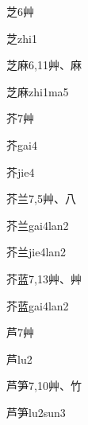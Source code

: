 \begin{Entry}{芝}{6}{⾋}
  \begin{Phonetics}{芝}{zhi1}
  \end{Phonetics}
\end{Entry}

\begin{Entry}{芝麻}{6,11}{⾋、⿇}
  \begin{Phonetics}{芝麻}{zhi1ma5}
  \end{Phonetics}
\end{Entry}

\begin{Entry}{芥}{7}{⾋}
  \begin{Phonetics}{芥}{gai4}
  \end{Phonetics}
  \begin{Phonetics}{芥}{jie4}
  \end{Phonetics}
\end{Entry}

\begin{Entry}{芥兰}{7,5}{⾋、⼋}
  \begin{Phonetics}{芥兰}{gai4lan2}
  \end{Phonetics}
  \begin{Phonetics}{芥兰}{jie4lan2}
  \end{Phonetics}
\end{Entry}

\begin{Entry}{芥蓝}{7,13}{⾋、⾋}
  \begin{Phonetics}{芥蓝}{gai4lan2}
  \end{Phonetics}
\end{Entry}

\begin{Entry}{芦}{7}{⾋}
  \begin{Phonetics}{芦}{lu2}
  \end{Phonetics}
\end{Entry}

\begin{Entry}{芦笋}{7,10}{⾋、⽵}
  \begin{Phonetics}{芦笋}{lu2sun3}
  \end{Phonetics}
\end{Entry}

